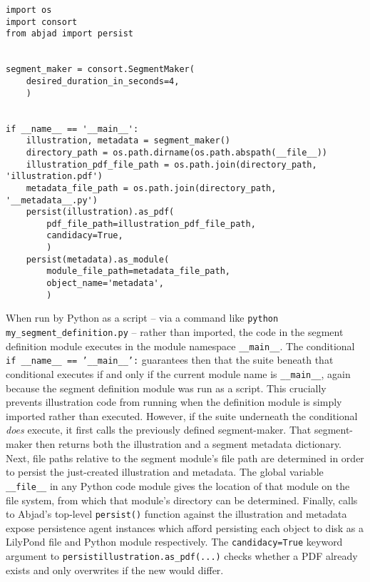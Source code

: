 \begin{singlespacing}
\vspace{-0.5\baselineskip}
\begin{verbatim}
import os
import consort
from abjad import persist


segment_maker = consort.SegmentMaker(
    desired_duration_in_seconds=4,
    )


if __name__ == '__main__':
    illustration, metadata = segment_maker()
    directory_path = os.path.dirname(os.path.abspath(__file__))
    illustration_pdf_file_path = os.path.join(directory_path, 'illustration.pdf')
    metadata_file_path = os.path.join(directory_path, '__metadata__.py')
    persist(illustration).as_pdf(
        pdf_file_path=illustration_pdf_file_path,
        candidacy=True,
        )
    persist(metadata).as_module(
        module_file_path=metadata_file_path,
        object_name='metadata',
        )
\end{verbatim}
\end{singlespacing}

\noindent When run by Python as a script -- via a command like
\texttt{python my_segment_definition.py} -- rather than imported, the
code in the segment definition module executes in the module namespace
\texttt{\_\_main\_\_}. The conditional \texttt{if __name__ ==
'__main__':} guarantees then that the suite beneath that conditional executes
if and only if the current module name is \texttt{\_\_main\_\_}, again because
the segment definition module was run as a script. This crucially prevents
illustration code from running when the definition module is simply imported
rather than executed. However, if the suite underneath the conditional
\emph{does} execute, it first calls the previously defined segment-maker. That
segment-maker then returns both the illustration and a segment metadata
dictionary. Next, file paths relative to the segment module's file path are
determined in order to persist the just-created illustration and metadata. The
global variable \texttt{\_\_file\_\_} in any Python code module gives the
location of that module on the file system, from which that module's directory
can be determined. Finally, calls to Abjad's top-level \texttt{persist()}
function against the illustration and metadata expose persistence agent
instances which afford persisting each object to disk as a
LilyPond file and Python module respectively. The \texttt{candidacy=True}
keyword argument to \texttt{persist{illustration}.as_pdf(...)}
checks whether a PDF already exists and only overwrites if the new would
differ.

